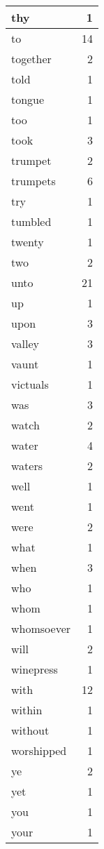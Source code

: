 \begin{center}
\begin{longtable}{l|r}
thy & 1\\ \hline 
to & 14\\ \hline 
together & 2\\ \hline 
told & 1\\ \hline 
tongue & 1\\ \hline 
too & 1\\ \hline 
took & 3\\ \hline 
trumpet & 2\\ \hline 
trumpets & 6\\ \hline 
try & 1\\ \hline 
tumbled & 1\\ \hline 
twenty & 1\\ \hline 
two & 2\\ \hline 
unto & 21\\ \hline 
up & 1\\ \hline 
upon & 3\\ \hline 
valley & 3\\ \hline 
vaunt & 1\\ \hline 
victuals & 1\\ \hline 
was & 3\\ \hline 
watch & 2\\ \hline 
water & 4\\ \hline 
waters & 2\\ \hline 
well & 1\\ \hline 
went & 1\\ \hline 
were & 2\\ \hline 
what & 1\\ \hline 
when & 3\\ \hline 
who & 1\\ \hline 
whom & 1\\ \hline 
whomsoever & 1\\ \hline 
will & 2\\ \hline 
winepress & 1\\ \hline 
with & 12\\ \hline 
within & 1\\ \hline 
without & 1\\ \hline 
worshipped & 1\\ \hline 
ye & 2\\ \hline 
yet & 1\\ \hline 
you & 1\\ \hline 
your & 1\\ \hline 
\end{longtable}
\end{center}



